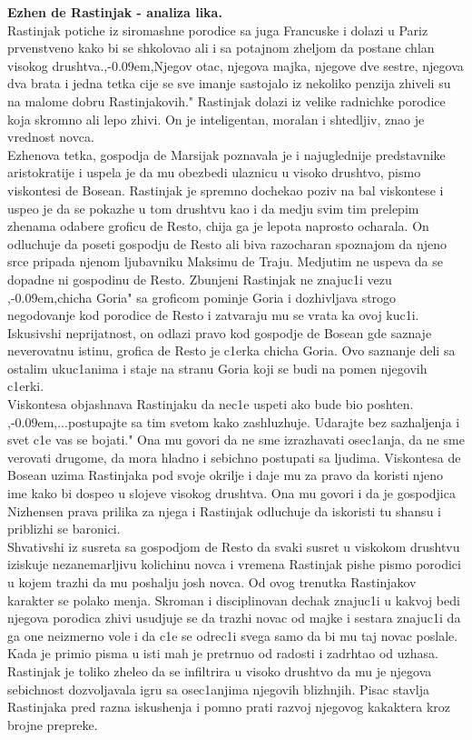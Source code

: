 \documentclass[11pt]{article}
\def \zn{,\kern-0.09em,}
\begin{document}
\begin{p}
\textbf{Ezhen de Rastinjak - analiza lika.}\\
Rastinjak potiche iz siromashne porodice sa juga Francuske i dolazi u Pariz prvenstveno kako bi se shkolovao ali i sa potajnom zheljom da postane chlan visokog drushtva.\zn Njegov otac, njegova majka, njegove dve sestre, njegova dva brata i jedna tetka cije se sve imanje sastojalo iz nekoliko penzija zhiveli su na malome dobru Rastinjakovih." Rastinjak dolazi iz velike radnichke porodice koja skromno ali lepo zhivi. On je inteligentan, moralan i shtedljiv, znao je vrednost novca.\\

Ezhenova tetka, gospodja de Marsijak poznavala je i najuglednije predstavnike aristokratije i uspela je da mu obezbedi ulaznicu u visoko drushtvo, pismo viskontesi de Bosean. Rastinjak je spremno dochekao poziv na bal viskontese i uspeo je da se pokazhe u tom drushtvu kao i da medju svim tim prelepim zhenama odabere groficu de Resto, chija ga je lepota naprosto ocharala. On odluchuje da poseti gospodju de Resto ali biva razocharan spoznajom da njeno srce pripada njenom ljubavniku Maksimu de Traju. Medjutim ne uspeva da se dopadne ni gospodinu de Resto. Zbunjeni Rastinjak ne znajuc1i vezu \zn chicha Goria" sa groficom pominje Goria i dozhivljava strogo negodovanje kod porodice de Resto i zatvaraju mu se vrata ka ovoj kuc1i. Iskusivshi neprijatnost, on odlazi pravo kod gospodje de Bosean gde saznaje neverovatnu istinu, grofica de Resto je c1erka chicha Goria. Ovo saznanje deli sa ostalim ukuc1anima i staje na stranu Goria koji se budi na pomen njegovih c1erki.\\ 

Viskontesa objashnava Rastinjaku da nec1e uspeti ako bude bio poshten. \zn ...postupajte sa tim svetom kako zashluzhuje. Udarajte bez sazhaljenja i svet c1e vas se bojati." Ona mu govori da ne sme izrazhavati osec1anja, da ne sme verovati drugome, da mora hladno i sebichno postupati sa ljudima. Viskontesa de Bosean uzima Rastinjaka pod svoje okrilje i daje mu za pravo da koristi njeno ime kako bi dospeo u slojeve visokog drushtva. Ona mu govori i da je gospodjica Nizhensen prava prilika za njega i Rastinjak odluchuje da iskoristi tu shansu i priblizhi se baronici.\\

S{}hvativshi iz susreta sa gospodjom de Resto da svaki susret u viskokom drushtvu iziskuje nezanemarljivu kolichinu novca i vremena Rastinjak pishe pismo porodici u kojem trazhi da mu poshalju josh novca. Od ovog trenutka Rastinjakov karakter se polako menja. Skroman i disciplinovan dechak znajuc1i u kakvoj bedi njegova porodica zhivi usudjuje se da trazhi novac od majke i sestara znajuc1i da ga one neizmerno vole i da c1e se odrec1i svega samo da bi mu taj novac poslale. Kada je primio pisma u isti mah je pretrnuo od radosti i zadrhtao od uzhasa. Rastinjak je toliko zheleo da se infiltrira u visoko drushtvo da mu je njegova sebichnost dozvoljavala igru sa osec1anjima njegovih blizhnjih. Pisac stavlja Rastinjaka pred razna iskushenja i pomno prati razvoj njegovog kakaktera kroz brojne prepreke.\\


\end{p}
\end{document}
